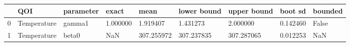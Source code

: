 \begin{tabular}{lllllllll}
\toprule
 & QOI & parameter & exact & mean & lower bound & upper bound & boot sd & bounded \\
\midrule
0 & Temperature & gamma1 & 1.000000 & 1.919407 & 1.431273 & 2.000000 & 0.142460 & False \\
1 & Temperature & beta0 & NaN & 307.255972 & 307.237835 & 307.287065 & 0.012253 & NaN \\
\bottomrule
\end{tabular}
